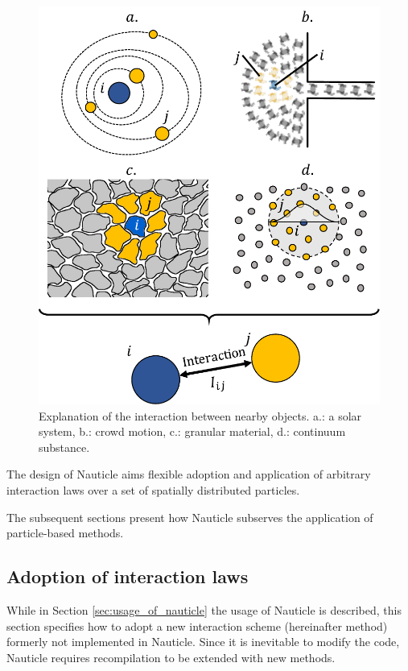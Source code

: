 \documentclass[a4paper,12pt,openany]{book}
\theoremstyle{break}
\begin{document}
\begin{figure}[H]
  \includegraphics[scale=0.5]{interaction_explain.pdf}
  \centering
  \caption{Explanation of the interaction between nearby objects. a.: a solar system, b.: crowd motion, c.: granular material, d.: continuum substance.}
  \label{fig:interaction_explain}
\end{figure}
The design of Nauticle aims flexible adoption and application of arbitrary interaction laws over a set of spatially distributed particles.


The subsequent sections present how Nauticle subserves the application of particle-based methods.

\subsection{Adoption of interaction laws}
While in Section \ref{sec:usage_of_nauticle} the usage of Nauticle is described, this section specifies how to adopt a new interaction scheme (hereinafter method) formerly not implemented in Nauticle. Since it is inevitable to modify the code, Nauticle requires recompilation to be extended with new methods.
\end{document}
